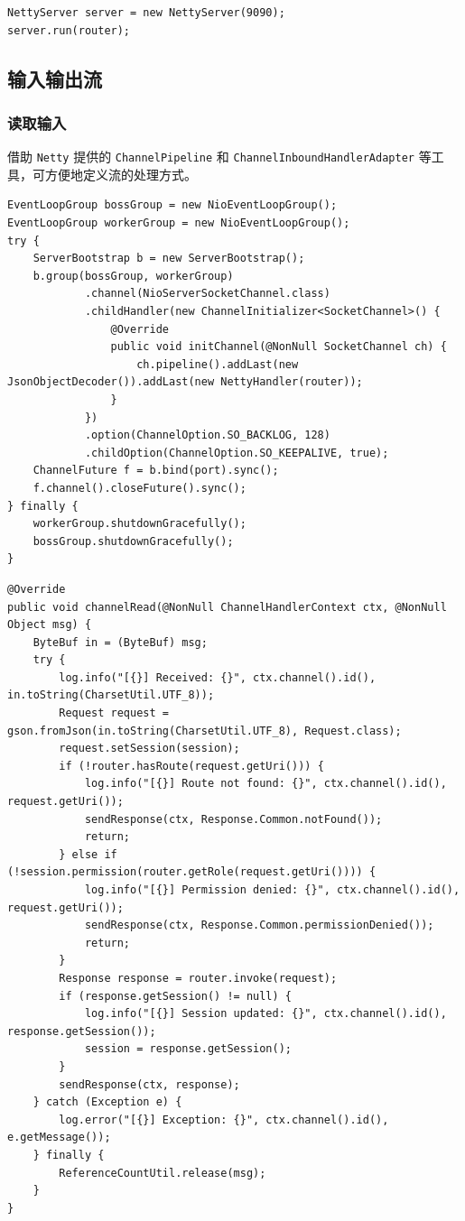\documentclass{article}
\begin{document}
\begin{lstlisting}
NettyServer server = new NettyServer(9090);
server.run(router);
\end{lstlisting}

\subsection{输入输出流}
\subsubsection{读取输入}

借助 \texttt{Netty} 提供的 \texttt{ChannelPipeline} 和 \texttt{ChannelInboundHandlerAdapter} 等工具，可方便地定义流的处理方式。

\begin{lstlisting}
EventLoopGroup bossGroup = new NioEventLoopGroup();
EventLoopGroup workerGroup = new NioEventLoopGroup();
try {
    ServerBootstrap b = new ServerBootstrap();
    b.group(bossGroup, workerGroup)
            .channel(NioServerSocketChannel.class)
            .childHandler(new ChannelInitializer<SocketChannel>() {
                @Override
                public void initChannel(@NonNull SocketChannel ch) {
                    ch.pipeline().addLast(new JsonObjectDecoder()).addLast(new NettyHandler(router));
                }
            })
            .option(ChannelOption.SO_BACKLOG, 128)
            .childOption(ChannelOption.SO_KEEPALIVE, true);
    ChannelFuture f = b.bind(port).sync();
    f.channel().closeFuture().sync();
} finally {
    workerGroup.shutdownGracefully();
    bossGroup.shutdownGracefully();
}
\end{lstlisting}

\newpage

\begin{lstlisting}
@Override
public void channelRead(@NonNull ChannelHandlerContext ctx, @NonNull Object msg) {
    ByteBuf in = (ByteBuf) msg;
    try {
        log.info("[{}] Received: {}", ctx.channel().id(), in.toString(CharsetUtil.UTF_8));
        Request request = gson.fromJson(in.toString(CharsetUtil.UTF_8), Request.class);
        request.setSession(session);
        if (!router.hasRoute(request.getUri())) {
            log.info("[{}] Route not found: {}", ctx.channel().id(), request.getUri());
            sendResponse(ctx, Response.Common.notFound());
            return;
        } else if (!session.permission(router.getRole(request.getUri()))) {
            log.info("[{}] Permission denied: {}", ctx.channel().id(), request.getUri());
            sendResponse(ctx, Response.Common.permissionDenied());
            return;
        }
        Response response = router.invoke(request);
        if (response.getSession() != null) {
            log.info("[{}] Session updated: {}", ctx.channel().id(), response.getSession());
            session = response.getSession();
        }
        sendResponse(ctx, response);
    } catch (Exception e) {
        log.error("[{}] Exception: {}", ctx.channel().id(), e.getMessage());
    } finally {
        ReferenceCountUtil.release(msg);
    }
}
\end{lstlisting}
\end{document}

